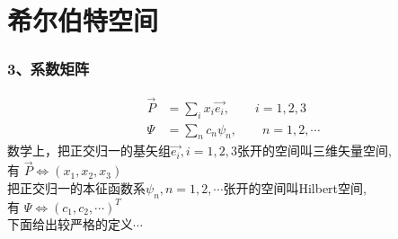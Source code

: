 \section{希尔伯特空间}

\begin{frame} [allowframebreaks=]
    \frametitle{3、系数矩阵}
    \begin{equation*}
        \begin{split}
            \vec{P}&=\sum_i{x_i\vec{e_i}}, \qquad i=1,2,3 \\
            \Psi&=\sum_n c_n \psi_n, \qquad n=1,2,\cdots 
        \end{split}  
    \end{equation*}
    数学上，把正交归一的基矢组{$\vec{e_i}, i=1,2,3$}张开的空间叫三维矢量空间, \\
    有 $\vec{P}\Leftrightarrow(x_1,x_2,x_3)$\\
    把正交归一的本征函数系{$\psi_n, n=1,2,\cdots$}张开的空间叫Hilbert空间,\\
    有 $\Psi\Leftrightarrow(c_1,c_2,\cdots)^T$\\
    下面给出较严格的定义$\cdots$
\end{frame} 

